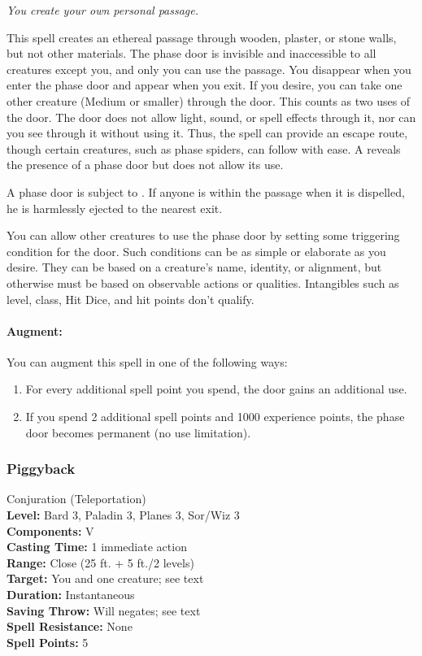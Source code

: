 \emph{You create your own personal passage.}

This spell creates an ethereal passage through wooden, plaster, or stone walls, but not other materials. 
The phase door is invisible and inaccessible to all creatures except you, and only you can use the passage. 
You disappear when you enter the phase door and appear when you exit. 
If you desire, you can take one other creature (Medium or smaller) through the door. 
This counts as two uses of the door. The door does not allow light, sound, or spell effects through it, nor can you see through it without using it. 
Thus, the spell can provide an escape route, though certain creatures, such as phase spiders, can follow with ease. 
A  reveals the presence of a phase door but does not allow its use.

A phase door is subject to . 
If anyone is within the passage when it is dispelled, he is harmlessly ejected to the nearest exit.

You can allow other creatures to use the phase door by setting some triggering condition for the door. 
Such conditions can be as simple or elaborate as you desire. 
They can be based on a creature's name, identity, or alignment, but otherwise must be based on observable actions or qualities. 
Intangibles such as level, class, Hit Dice, and hit points don't qualify. 

\paragraph{Augment:} You can augment this spell in one of the following ways:
\begin{enumerate}
 \item For every additional spell point you spend, the door gains an additional use.
 \item If you spend 2 additional spell points and 1000 experience points, the phase door becomes permanent (no use limitation).
\end{enumerate}
\subsubsection{Piggyback}
\label{Spell:Piggyback}
Conjuration (Teleportation)
\\ \textbf{Level:} Bard 3, Paladin 3, Planes 3, Sor/Wiz 3
\\ \textbf{Components:} V
\\ \textbf{Casting Time:} 1 immediate action
\\ \textbf{Range:} Close (25 ft. + 5 ft./2 levels)
\\ \textbf{Target:} You and one creature; see text
\\ \textbf{Duration:} Instantaneous
\\ \textbf{Saving Throw:} Will negates; see text
\\ \textbf{Spell Resistance:} None
\\ \textbf{Spell Points:} 5


